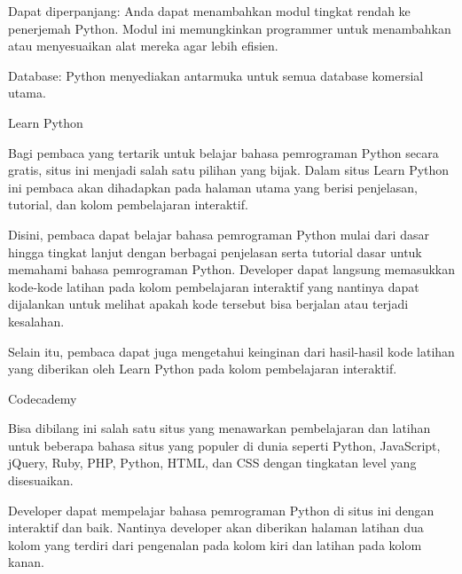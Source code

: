 \vspace{14pt}
\noindent 
{\fontsize{14pt}{14pt}\selectfont Dapat diperpanjang: Anda dapat menambahkan modul tingkat rendah ke penerjemah Python. Modul ini memungkinkan programmer untuk menambahkan atau menyesuaikan alat mereka agar lebih efisien. \\} \par
\vspace{14pt}
\noindent 
{\fontsize{14pt}{14pt}\selectfont Database: Python menyediakan antarmuka untuk semua database komersial utama. \\} \par
\noindent 
{\fontsize{14pt}{14pt}\selectfont Learn Python \\} \par
\noindent 
{\fontsize{14pt}{14pt}\selectfont Bagi pembaca yang tertarik untuk belajar bahasa pemrograman Python secara gratis, situs ini menjadi salah satu pilihan yang bijak. Dalam situs Learn Python ini pembaca akan dihadapkan pada halaman utama yang berisi penjelasan, tutorial, dan kolom pembelajaran interaktif. \\} \par
\noindent 
{\fontsize{14pt}{14pt}\selectfont Disini, pembaca dapat belajar bahasa pemrograman Python mulai dari dasar hingga tingkat lanjut dengan berbagai penjelasan serta tutorial dasar untuk memahami bahasa pemrograman Python. Developer dapat langsung memasukkan kode-kode latihan pada kolom pembelajaran interaktif yang nantinya dapat dijalankan untuk melihat apakah kode tersebut bisa berjalan atau terjadi kesalahan. \\} \par
\noindent 
{\fontsize{14pt}{14pt}\selectfont Selain itu, pembaca dapat juga mengetahui keinginan dari hasil-hasil kode latihan yang diberikan oleh Learn Python pada kolom pembelajaran interaktif. \\} \par
\vspace{14pt}
\noindent 
{\fontsize{14pt}{14pt}\selectfont Codecademy \\} \par
\noindent 
{\fontsize{14pt}{14pt}\selectfont Bisa dibilang ini salah satu situs yang menawarkan pembelajaran dan latihan untuk beberapa bahasa situs yang populer di dunia seperti Python, JavaScript, jQuery, Ruby, PHP, Python, HTML, dan CSS dengan tingkatan level yang disesuaikan. \\} \par
\noindent 
{\fontsize{14pt}{14pt}\selectfont Developer dapat mempelajar bahasa pemrograman Python di situs ini dengan interaktif dan baik. Nantinya developer akan diberikan halaman latihan dua kolom yang terdiri dari pengenalan pada kolom kiri dan latihan pada kolom kanan. \\} \par
